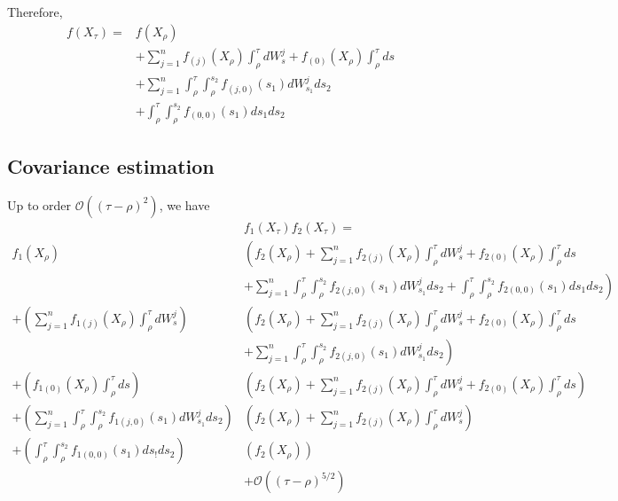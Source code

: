 \documentclass[12pt]{article}
\begin{document}
Therefore, 
\begin{equation} 
\begin{aligned}
f( X_\tau) =& f(X_\rho) \\
& + \sum_{j=1}^n f_{(j)} (X_\rho) \int_\rho^\tau dW_s^j 
  + f_{(0)} (X_\rho) \int_\rho^\tau ds \\
& + \sum_{j=1}^n \int_\rho^\tau \int_\rho^{s_2} f_{(j,0)} (s_1) dW_{s_1}^j ds_2 \\
& + \int_\rho^\tau \int_\rho^{s_2} f_{(0,0)} (s_1) ds_1 ds_2 
\end{aligned}
\end{equation}

\subsection{Covariance estimation}

Up to order $\mathcal{O} ((\tau - \rho)^2)$, we have
\begin{equation}
\begin{aligned}
& f_1(X_\tau) f_2(X_\tau) = \\
f_1(X_\rho) 
& \left( f_2(X_\rho) 
 + \sum_{j=1}^n f_{2(j)} (X_\rho) \int_\rho^\tau dW_s^j 
 + f_{2(0)} (X_\rho) \int_\rho^\tau ds \right. \\
& \left. + \sum_{j=1}^n \int_\rho^\tau \int_\rho^{s_2} f_{2(j,0)} (s_1) dW_{s_1}^j ds_2 
 + \int_\rho^\tau \int_\rho^{s_2} f_{2(0,0)} (s_1) ds_1 ds_2 \right) \\
 + \left( \sum_{j=1}^n f_{1(j)}(X_\rho) \int_\rho^\tau dW_s^j \right)
& \left( f_2(X_\rho) 
 + \sum_{j=1}^n f_{2(j)} (X_\rho) \int_\rho^\tau dW_s^j 
 + f_{2(0)} (X_\rho) \int_\rho^\tau ds \right. \\
& \left. + \sum_{j=1}^n \int_\rho^\tau \int_\rho^{s_2} f_{2(j,0)} (s_1) dW_{s_1}^j ds_2 \right) \\
+ \left( f_{1(0)} (X_\rho) \int_\rho^\tau ds \right)
& \left( f_2(X_\rho) 
 + \sum_{j=1}^n f_{2(j)} (X_\rho) \int_\rho^\tau dW_s^j 
 + f_{2(0)} (X_\rho) \int_\rho^\tau ds \right) \\
 + \left( \sum_{j=1}^n \int_\rho^\tau \int_\rho^{s_2} f_{1(j,0)}(s_1) dW_{s_1}^j ds_2 \right)
& \left( f_2(X_\rho) 
 + \sum_{j=1}^n f_{2(j)} (X_\rho) \int_\rho^\tau dW_s^j  \right) \\
 + \left( \int_\rho^\tau \int_\rho^{s_2} f_{1(0,0)} (s_1) ds_! ds_2 \right)
& \left( f_2(X_\rho) \right)
\\ & + \mathcal{O} ((\tau - \rho)^{5/2})
\end{aligned}
\end{equation}
\end{document}
